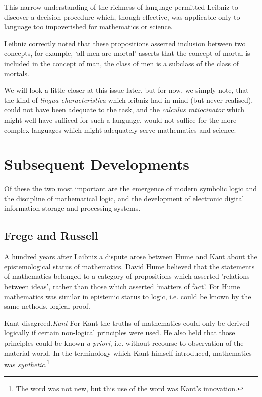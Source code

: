 This narrow understanding of the richness of language permitted Leibniz to discover a decision procedure which, though effective, was applicable only to language too impoverished for mathematics or science.

Leibniz correctly noted that these propositions asserted inclusion between two concepts, for example, `all men are mortal' asserts that the concept of mortal is included in the concept of man, the class of men is a subclass of the class of mortals.

We will look a little closer at this issue later, but for now, we simply note, that the kind of \emph{lingua characteristica} which leibniz had in mind (but never realised), could not have been adequate to the task, and the \emph{calculus ratiocinator} which might well have sufficed for such a language, would not suffice for the more complex languages which might adequately serve mathematics and science.

\section{Subsequent Developments}

Of these the two most important are the emergence of modern symbolic logic and the discipline of
mathematical logic, and the development of electronic digital information storage and processing
systems.


\subsection{Frege and Russell}


A hundred years after Laibniz a dispute arose between Hume and Kant about the epistemological status of mathematics.
David Hume believed that the statements of mathematics belonged to a category of propositions which asserted 'relations between ideas', rather than those which asserted `matters of fact'.
For Hume mathematics was similar in epistemic status to logic, i.e. could be known by the same nethods, logical proof.

Kant disagreed.\emph{Kant}
For Kant the truths of mathematics could only be derived logically if certain non-logical principles were used.
He also held that those principles could be known \emph{a priori}, i.e. without recourse to observation of the material world.
In the terminology which Kant himself introduced, mathematics was \emph{synthetic}.\footnote{The word was not new, but this use of the word was Kant's innovation.} 

